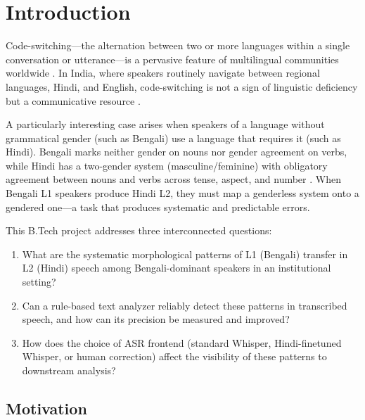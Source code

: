 \documentclass[11pt,a4paper]{report}
\renewcommand{\headrulewidth}{0.4pt}
\begin{document}
\clearpage
{}
\setcounter{page}{1}
\pagestyle{fancy}
\fancyhf{}
\fancyhead[L]{\leftmark}
\fancyhead[R]{\thepage}
\renewcommand{\headrulewidth}{0.4pt}

\chapter{Introduction}
\label{sec:intro}

Code-switching---the alternation between two or more languages within a single conversation or utterance---is a pervasive feature of multilingual communities worldwide \citep{poplack1980sometimes, myers1997duelling}. In India, where speakers routinely navigate between regional languages, Hindi, and English, code-switching is not a sign of linguistic deficiency but a communicative resource \citep{bhatia2004world}.

A particularly interesting case arises when speakers of a language without grammatical gender (such as Bengali) use a language that requires it (such as Hindi). Bengali marks neither gender on nouns nor gender agreement on verbs, while Hindi has a two-gender system (masculine/feminine) with obligatory agreement between nouns and verbs across tense, aspect, and number \citep{kachru2006hindi}. When Bengali L1 speakers produce Hindi L2, they must map a genderless system onto a gendered one---a task that produces systematic and predictable errors.

This B.Tech project addresses three interconnected questions:

\begin{enumerate}
  \item What are the systematic morphological patterns of L1 (Bengali) transfer in L2 (Hindi) speech among Bengali-dominant speakers in an institutional setting?
  \item Can a rule-based text analyzer reliably detect these patterns in transcribed speech, and how can its precision be measured and improved?
  \item How does the choice of ASR frontend (standard Whisper, Hindi-finetuned Whisper, or human correction) affect the visibility of these patterns to downstream analysis?
\end{enumerate}

\section{Motivation}
\end{document}
